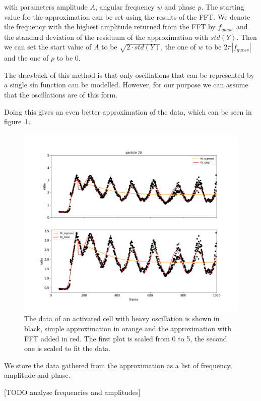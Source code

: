 with parameters amplitude $A$, angular frequency $w$ and phase $p$. The starting value for the approximation can be set using the results of the FFT. We denote the frequency with the highest amplitude returned from the FFT by $f_{guess}$ and the standard deviation of the residuum of the approximation with $std(Y)$. Then we can set the start value of $A$ to be $\sqrt{2 \cdot std(Y)}$, the one of $w$ to be $2\pi |f_{guess}|$ and the one of $p$ to be $0$.

The drawback of this method is that only oscillations that can be represented by a single sin function can be modelled. However, for our purpose we can assume that the oscillations are of this form.

Doing this gives an even better approximation of the data, which can be seen in figure~\ref{fig:particle_vis_fft_approx}.

\begin{figure}[h]
	\centering
	\includegraphics[width=\textwidth]{fig/particle_vis_fft_approx_pos}
	
	\caption{The data of an activated cell with heavy oscillation is shown in black, simple approximation in orange and the approximation with FFT added in red. The first plot is scaled from 0 to 5, the second one is scaled to fit the data.}
	\label{fig:particle_vis_fft_approx}
\end{figure}

We store the data gathered from the approximation as a list of frequency, amplitude and phase.

[TODO analyse frequencies and amplitudes]

